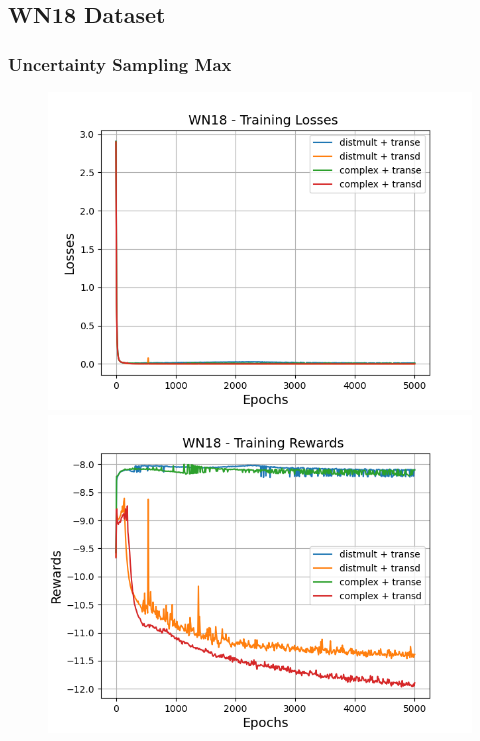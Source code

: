 \subsection{WN18 Dataset}

\subsubsection{Uncertainty Sampling Max}

\begin{figure}
    \centering
    \begin{minipage}{.5\textwidth}
      \centering
      \includegraphics[width=0.9\linewidth]{figures/results/gan_train/not_pretrained/uncertainty/max/entropy/wn18/gan_train_uncertainty_wn18_losses.png}
    \end{minipage}%
    \begin{minipage}{.5\textwidth}
      \centering
      \includegraphics[width=0.9\linewidth]{figures/results/gan_train/not_pretrained/uncertainty/max/entropy/wn18/gan_train_uncertainty_wn18_rewards.png}

\end{minipage}
\end{figure}
